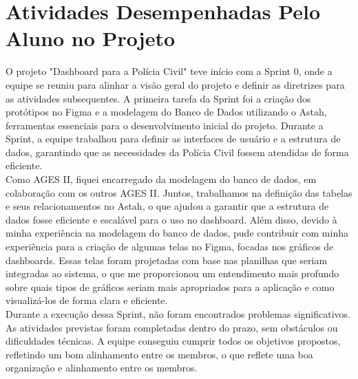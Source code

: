 \section[Atividades Desempenhadas Pelo Aluno no Projeto]{Atividades Desempenhadas Pelo Aluno no Projeto}


O projeto "Dashboard para a Polícia Civil" teve início com a Sprint 0, onde a equipe se reuniu para alinhar a visão geral do projeto e definir as diretrizes para as atividades subsequentes. A primeira tarefa da Sprint foi a criação dos protótipos no Figma e a modelagem do Banco de Dados utilizando o Astah, ferramentas essenciais para o desenvolvimento inicial do projeto. Durante a Sprint, a equipe trabalhou para definir as interfaces de usuário e a estrutura de dados, garantindo que as necessidades da Polícia Civil fossem atendidas de forma eficiente.\\
Como AGES II, fiquei encarregado da modelagem do banco de dados, em colaboração com os outros AGES II. Juntos, trabalhamos na definição das tabelas e seus relacionamentos no Astah, o que ajudou a garantir que a estrutura de dados fosse eficiente e escalável para o uso no dashboard. Além disso, devido à minha experiência na modelagem do banco de dados, pude contribuir com minha experiência para a criação de algumas telas no Figma, focadas nos gráficos de dashboards. Essas telas foram projetadas com base nas planilhas que seriam integradas ao sistema, o que me proporcionou um entendimento mais profundo sobre quais tipos de gráficos seriam mais apropriados para a aplicação e como visualizá-los de forma clara e eficiente.\\
Durante a execução dessa Sprint, não foram encontrados problemas significativos. As atividades previstas foram completadas dentro do prazo, sem obstáculos ou dificuldades técnicas. A equipe conseguiu cumprir todos os objetivos propostos, refletindo um bom alinhamento entre os membros, o que reflete uma boa organização e alinhamento entre os membros.


